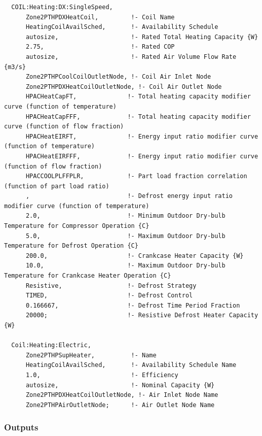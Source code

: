 \begin{lstlisting}
  COIL:Heating:DX:SingleSpeed,
      Zone2PTHPDXHeatCoil,         !- Coil Name
      HeatingCoilAvailSched,       !- Availability Schedule
      autosize,                    !- Rated Total Heating Capacity {W}
      2.75,                        !- Rated COP
      autosize,                    !- Rated Air Volume Flow Rate {m3/s}
      Zone2PTHPCoolCoilOutletNode, !- Coil Air Inlet Node
      Zone2PTHPDXHeatCoilOutletNode, !- Coil Air Outlet Node
      HPACHeatCapFT,              !- Total heating capacity modifier curve (function of temperature)
      HPACHeatCapFFF,             !- Total heating capacity modifier curve (function of flow fraction)
      HPACHeatEIRFT,              !- Energy input ratio modifier curve (function of temperature)
      HPACHeatEIRFFF,             !- Energy input ratio modifier curve (function of flow fraction)
      HPACCOOLPLFFPLR,            !- Part load fraction correlation (function of part load ratio)
      ,                           !- Defrost energy input ratio modifier curve (function of temperature)
      2.0,                        !- Minimum Outdoor Dry-bulb Temperature for Compressor Operation {C}
      5.0,                        !- Maximum Outdoor Dry-bulb Temperature for Defrost Operation {C}
      200.0,                      !- Crankcase Heater Capacity {W}
      10.0,                       !- Maximum Outdoor Dry-bulb Temperature for Crankcase Heater Operation {C}
      Resistive,                  !- Defrost Strategy
      TIMED,                      !- Defrost Control
      0.166667,                   !- Defrost Time Period Fraction
      20000;                      !- Resistive Defrost Heater Capacity {W}

  Coil:Heating:Electric,
      Zone2PTHPSupHeater,          !- Name
      HeatingCoilAvailSched,       !- Availability Schedule Name
      1.0,                         !- Efficiency
      autosize,                    !- Nominal Capacity {W}
      Zone2PTHPDXHeatCoilOutletNode, !- Air Inlet Node Name
      Zone2PTHPAirOutletNode;      !- Air Outlet Node Name
\end{lstlisting}

\subsubsection{Outputs}\label{outputs-8-009}

